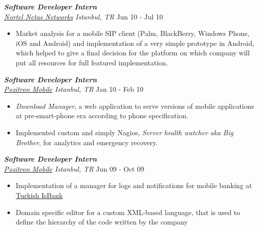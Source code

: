 \documentclass[line, margin]{res}
\begin{document}
\begin{resume}
{\sl \textbf{Software Developer Intern} \\ \href{http://netas.com.tr/en}{Nortel Netas Networks} Istanbul, TR} \hfill Jun 10 - Jul 10 \\
\vspace{-0.3cm}
\begin{itemize} \itemsep -2pt
  \item Market analysis for a mobile SIP client (Palm, BlackBerry, Windows Phone, iOS and Android) and implementation of a very simple prototype in Android, which helped to give a final decision for the platform on which company will put all resources for full featured implementation.
\end{itemize}

{\sl \textbf{Software Developer Intern} \\ \href{http://www.pozitron.com/}{Pozitron Mobile} Istanbul, TR} \hfill Jan 10 - Feb 10 \\
\vspace{-0.3cm}
\begin{itemize} \itemsep -2pt
  \item \textit{Download Manager}, a web application to serve versions of mobile applications at pre-smart-phone era according to phone specification.
  \item Implemented custom and simply Nagios, \textit{Server health watcher aka Big Brother}, for analytics and emergency recovery.
\end{itemize}

{\sl \textbf{Software Developer Intern} \\ \href{http://www.pozitron.com/}{Pozitron Mobile} Istanbul, TR} \hfill Jun 09 - Oct 09\\
\vspace{-0.3cm}
\begin{itemize} \itemsep -2pt
  \item Implementation of a manager for logs and notifications for mobile banking at \href{http://www.isbank.com.tr/English/}{Turkish IsBank}
  \item Domain specific editor for a custom XML-based language, that is used to define the hierarchy of the code written by the company
\end{itemize}


\end{resume}
\end{document}
